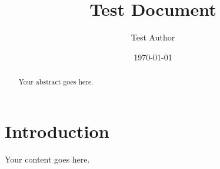\documentclass{article}
\title{Test Document}
\author{Test Author}
\date{\today}
\begin{document}
\maketitle

\begin{abstract}
Your abstract goes here.
\end{abstract}

\section{Introduction}

Your content goes here.
\end{document}
